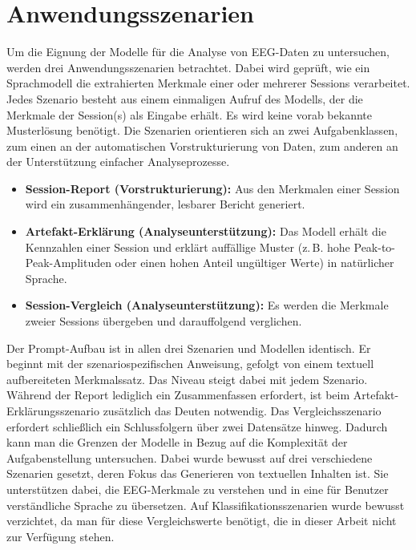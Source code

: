 \section{Anwendungsszenarien}
\label{sec:szenarien}
Um die Eignung der Modelle für die Analyse von \ac{EEG}-Daten zu untersuchen, werden drei Anwendungsszenarien betrachtet. Dabei wird geprüft, wie ein Sprachmodell die extrahierten Merkmale einer oder mehrerer Sessions verarbeitet. Jedes Szenario besteht aus einem einmaligen Aufruf des Modells, der die Merkmale der Session(s) als Eingabe erhält. Es wird keine vorab bekannte Musterlösung benötigt. Die Szenarien orientieren sich an zwei Aufgabenklassen, zum einen an der automatischen Vorstrukturierung von Daten, zum anderen an der Unterstützung einfacher Analyseprozesse.
\begin{itemize}
\item \textbf{Session-Report (Vorstrukturierung):} Aus den Merkmalen einer Session wird ein zusammenhängender, lesbarer Bericht generiert.
\item \textbf{Artefakt-Erklärung (Analyseunterstützung):} Das Modell erhält die Kennzahlen einer Session und erklärt auffällige Muster (z.\,B. hohe Peak-to-Peak-Amplituden oder einen hohen Anteil ungültiger Werte) in natürlicher Sprache.
\item \textbf{Session-Vergleich (Analyseunterstützung):} Es werden die Merkmale zweier Sessions übergeben und darauffolgend verglichen.
\end{itemize}

\noindent Der Prompt-Aufbau ist in allen drei Szenarien und Modellen identisch. Er beginnt mit der szenariospezifischen Anweisung, gefolgt von einem textuell aufbereiteten Merkmalssatz. Das Niveau steigt dabei mit jedem Szenario. Während der Report lediglich ein Zusammenfassen erfordert, ist beim Artefakt-Erklärungsszenario zusätzlich das Deuten notwendig. Das Vergleichsszenario erfordert schließlich ein Schlussfolgern über zwei Datensätze hinweg. Dadurch kann man die Grenzen der Modelle in Bezug auf die Komplexität der Aufgabenstellung untersuchen.
Dabei wurde bewusst auf drei verschiedene Szenarien gesetzt, deren Fokus das Generieren von textuellen Inhalten ist. Sie unterstützen dabei, die \ac{EEG}-Merkmale zu verstehen und in eine für Benutzer verständliche Sprache zu übersetzen. Auf Klassifikationsszenarien wurde bewusst verzichtet, da man für diese Vergleichswerte benötigt, die in dieser Arbeit nicht zur Verfügung stehen.
